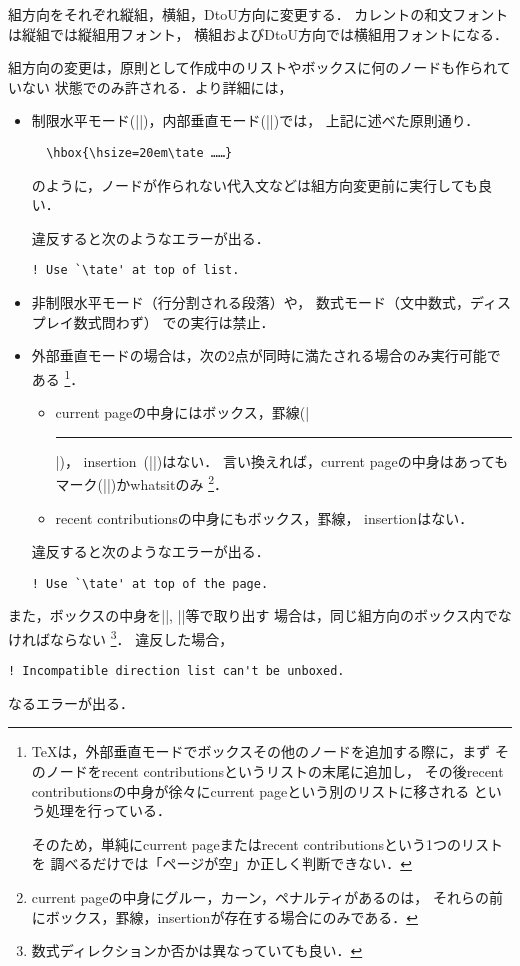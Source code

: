 \documentclass[a4paper,11pt,nomag]{jsarticle}
\begin{document}
\begin{cslist}
  組方向をそれぞれ縦組，横組，DtoU方向に変更する．
  カレントの和文フォントは縦組では縦組用フォント，
  横組およびDtoU方向では横組用フォントになる．

  組方向の変更は，原則として作成中のリストやボックスに何のノードも作られていない
  状態でのみ許される．より詳細には，
\begin{itemize}
  \item 制限水平モード(|\hbox|)，内部垂直モード(|\vbox|)では，
  上記に述べた原則通り．
\begin{verbatim}
  \hbox{\hsize=20em\tate ……}
\end{verbatim}
  のように，ノードが作られない代入文などは組方向変更前に実行しても良い．

  違反すると次のようなエラーが出る．
\begin{verbatim}
! Use `\tate' at top of list.
\end{verbatim}

  \item 非制限水平モード（行分割される段落）や，
  数式モード（文中数式，ディスプレイ数式問わず）
  での実行は禁止．

  \item 外部垂直モードの場合は，次の2点が同時に満たされる場合のみ実行可能である
    \footnote{%
    \TeX は，外部垂直モードでボックスその他のノードを追加する際に，まず
    そのノードをrecent contributionsというリストの末尾に追加し，
    その後recent contributionsの中身が徐々にcurrent pageという別のリストに移される
    という処理を行っている．

    そのため，単純にcurrent pageまたはrecent contributionsという1つのリストを
    調べるだけでは「ページが空」か正しく判断できない．
    }．
  \begin{itemize}
    \item current pageの中身にはボックス，罫線(|\hrule|)，
      insertion~(|\insert|)はない．
      言い換えれば，current pageの中身はあっても
      マーク(|\mark|)かwhatsitのみ
      \footnote{current pageの中身にグルー，カーン，ペナルティがあるのは，
      それらの前にボックス，罫線，insertionが存在する場合にのみである．}．
    \item recent contributionsの中身にもボックス，罫線，
      insertionはない．
  \end{itemize}
  違反すると次のようなエラーが出る．
\begin{verbatim}
! Use `\tate' at top of the page.
\end{verbatim}

\end{itemize}

  また，ボックスの中身を|\unhbox|, |\unvbox|等で取り出す
  場合は，同じ組方向のボックス内でなければならない
  \footnote{数式ディレクションか否かは異なっていても良い．}．
  違反した場合，
\begin{verbatim}
! Incompatible direction list can't be unboxed.
\end{verbatim}
  なるエラーが出る．
\end{cslist}
\end{document}
